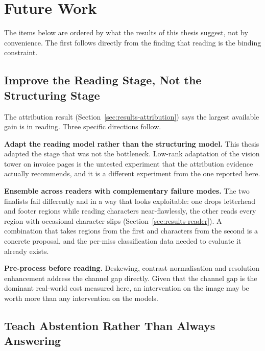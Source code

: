\chapter{Future Work}
\label{ch:future-work}


The items below are ordered by what the results of this thesis suggest, not by convenience.
The first follows directly from the finding that reading is the binding constraint.

\section{Improve the Reading Stage, Not the Structuring Stage}
\label{sec:fw-reader}

The attribution result (Section~\ref{sec:results-attribution}) says the largest available gain is in
reading. Three specific directions follow.

\textbf{Adapt the reading model rather than the structuring model.} This thesis adapted the stage
that was not the bottleneck. Low-rank adaptation of the vision tower on invoice pages is the
untested experiment that the attribution evidence actually recommends, and it is a different
experiment from the one reported here.

\textbf{Ensemble across readers with complementary failure modes.} The two finalists fail
differently and in a way that looks exploitable: one drops letterhead and footer regions while
reading characters near-flawlessly, the other reads every region with occasional character slips
(Section~\ref{sec:results-reader}). A combination that takes regions from the first and characters from
the second is a concrete proposal, and the per-miss classification data needed to evaluate it
already exists.

\textbf{Pre-process before reading.} Deskewing, contrast normalisation and resolution
enhancement address the channel gap directly. Given that the channel gap is the dominant
real-world cost measured here, an intervention on the image may be worth more than any
intervention on the models.

\section{Teach Abstention Rather Than Always Answering}
\label{sec:fw-abstention}

